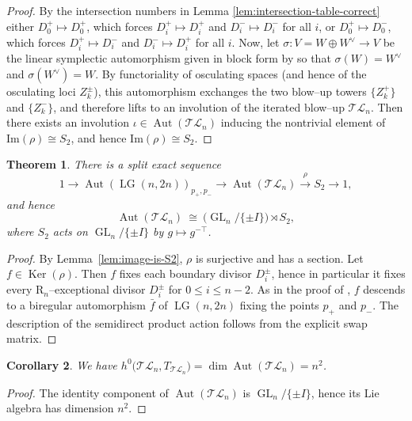 \documentclass[10pt]{amsart}
\newtheorem{theorem}{Theorem}[section]
\newtheorem{corollary}[theorem]{Corollary}
\theoremstyle{definition}
\newcommand{\Aut}{\operatorname{Aut}}
\newcommand{\LG}{\operatorname{LG}}
\DeclareMathOperator{\Ker}{Ker}
\newcommand{\TL}{\mathcal{TL}}
\newcommand{\GL}{\operatorname{GL}}
\newcommand{\RL}{\mathrm{R}}
\theoremstyle{plain} %
\begin{document}
\begin{proof}
By the intersection numbers in Lemma \ref{lem:intersection-table-correct} either $D_0^+\mapsto D_0^+$, which forces $D_i^+\mapsto D_i^+$ and $D_i^-\mapsto D_i^-$ for all $i$, or $D_0^+\mapsto D_0^-$, which forces $D_i^+\mapsto D_i^-$ and $D_i^-\mapsto D_i^+$ for all $i$. Now, let $\sigma\colon V=W\oplus W^\vee\to V$ be the linear symplectic automorphism given in block form by so that $\sigma(W)=W^\vee$ and $\sigma(W^\vee)=W$. By functoriality of osculating spaces (and hence of the osculating loci $Z_k^\pm$), this automorphism exchanges the two blow--up towers $\{Z_k^+\}$ and $\{Z_k^-\}$, and therefore lifts to an involution of the iterated blow--up $\TL_n$. Then there exists an involution $\iota\in \Aut(\TL_n)$ inducing the nontrivial element of $\mathrm{Im}(\rho)\cong S_2$, and hence $\mathrm{Im}(\rho)\cong S_2$.
\end{proof}

\begin{theorem}\label{thm:Aut-TLn}
There is a split exact sequence
\[
1\longrightarrow \Aut(\LG(n,2n))_{p_+,p_-}\longrightarrow \Aut(\TL_n)
\overset{\rho}{\longrightarrow} S_2\longrightarrow 1,
\]
and hence
\[
\Aut(\TL_n)\ \cong\ \bigl(\GL_n/\{\pm I\}\bigr)\rtimes S_2,
\]
where $S_2$ acts on $\GL_n/\{\pm I\}$ by $g\mapsto g^{-\top}$.
\end{theorem}

\begin{proof}
By Lemma~\ref{lem:image-is-S2}, $\rho$ is surjective and has a section. Let $f\in \Ker(\rho)$. Then $f$ fixes each boundary divisor $D_i^\pm$, hence in particular it fixes every $\RL_n$--exceptional divisor $D_i^\pm$ for $0\le i\le n-2$. As in the proof of \cite[Lemma 4.6]{F26}, $f$ descends to a biregular automorphism $\bar f$ of $\LG(n,2n)$ fixing the points $p_+$ and $p_-$. The description of the semidirect product action follows from the explicit swap matrix.
\end{proof}


\begin{corollary}\label{cor:H0T}
We have $h^0\big(\TL_n,T_{\TL_n}\big)=\dim \Aut(\TL_n)=n^2$.
\end{corollary}
\begin{proof}
The identity component of $\Aut(\TL_n)$ is $\GL_n/\{\pm I\}$, hence its Lie algebra has
dimension $n^2$.
\end{proof}
\end{document}
